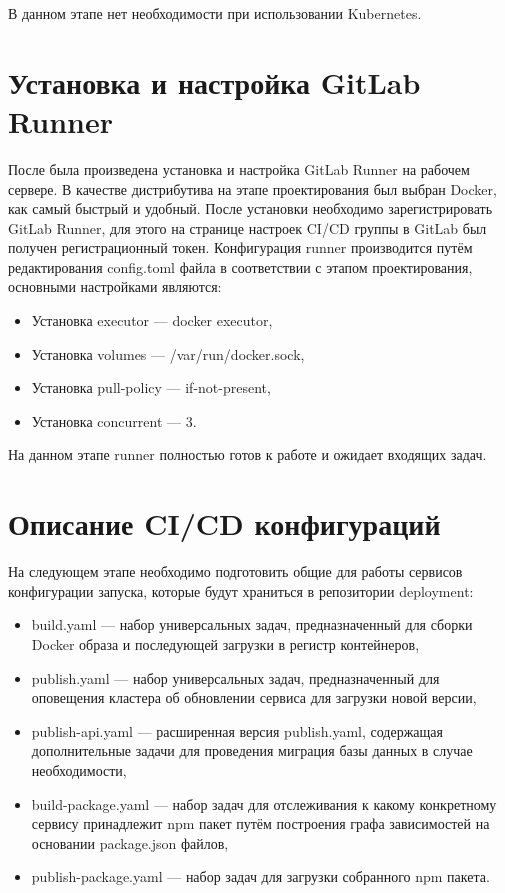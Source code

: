 В данном этапе нет необходимости при использовании Kubernetes.

\section{Установка и настройка GitLab Runner}

После была произведена установка и настройка GitLab Runner на рабочем сервере.
В качестве дистрибутива на этапе проектирования был выбран Docker, как самый быстрый и удобный.
После установки необходимо зарегистрировать GitLab Runner, для этого на странице настроек CI/CD группы в GitLab был получен регистрационный токен.
Конфигурация runner производится путём редактирования config.toml\cite{web:gitlab:docs} файла в соответствии с этапом проектирования, основными настройками являются:

\begin{itemize}
    \item Установка executor --- docker executor,
    \item Установка volumes --- /var/run/docker.sock\cite{web:docker:docs},
    \item Установка pull-policy --- if-not-present,
    \item Установка concurrent --- 3.
\end{itemize}

На данном этапе runner полностью готов к работе и ожидает входящих задач.

\section{Описание CI/CD конфигураций}

На следующем этапе необходимо подготовить общие для работы сервисов конфигурации запуска, которые будут храниться в репозитории deployment:

\begin{itemize}
    \item build.yaml --- набор универсальных задач, предназначенный для сборки Docker образа и последующей загрузки в регистр контейнеров,
    \item publish.yaml --- набор универсальных задач, предназначенный для оповещения кластера об обновлении сервиса для загрузки новой версии,
    \item publish-api.yaml --- расширенная версия publish.yaml, содержащая дополнительные задачи для проведения миграция базы данных в случае необходимости,
    \item build-package.yaml --- набор задач для отслеживания к какому конкретному сервису принадлежит npm пакет путём построения графа зависимостей на основании package.json файлов,
    \item publish-package.yaml --- набор задач для загрузки собранного npm пакета.
\end{itemize}

